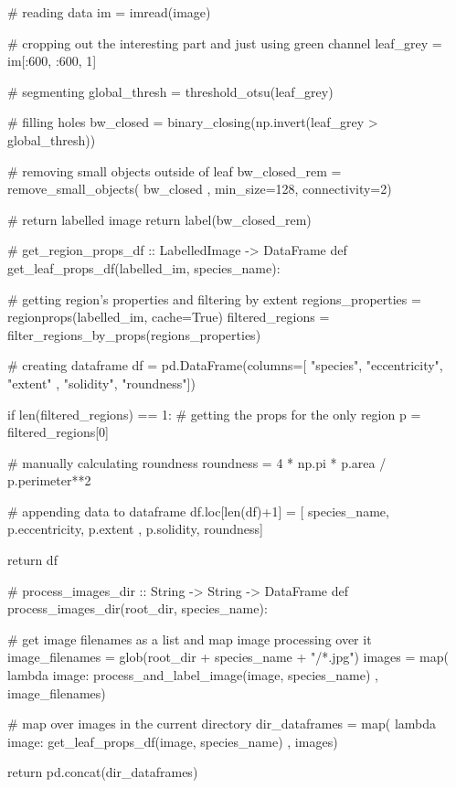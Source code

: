     # reading data
    im = imread(image)

    # cropping out the interesting part and just using green channel
    leaf_grey = im[:600, :600, 1]

    # segmenting
    global_thresh = threshold_otsu(leaf_grey)

    # filling holes
    bw_closed = binary_closing(np.invert(leaf_grey > global_thresh))

    # removing small objects outside of leaf
    bw_closed_rem = remove_small_objects( bw_closed
                                        , min_size=128, connectivity=2)

    # return labelled image
    return label(bw_closed_rem)


# get_region_props_df :: LabelledImage -> DataFrame
def get_leaf_props_df(labelled_im, species_name):

    # getting region's properties and filtering by extent
    regions_properties = regionprops(labelled_im, cache=True)
    filtered_regions = filter_regions_by_props(regions_properties)

    # creating dataframe
    df = pd.DataFrame(columns=[ "species", "eccentricity", "extent"
                              , "solidity", "roundness"])

    if len(filtered_regions) == 1:
        # getting the props for the only region
        p = filtered_regions[0]

        # manually calculating roundness
        roundness = 4 * np.pi * p.area / p.perimeter**2

        # appending data to dataframe
        df.loc[len(df)+1] = [ species_name, p.eccentricity, p.extent
                            , p.solidity, roundness]

    return df


# process_images_dir :: String -> String -> DataFrame
def process_images_dir(root_dir, species_name):

    # get image filenames as a list and map image processing over it
    image_filenames = glob(root_dir + species_name + "/*.jpg")
    images = map( lambda image: process_and_label_image(image, species_name)
                , image_filenames)

    # map over images in the current directory
    dir_dataframes = map( lambda image: get_leaf_props_df(image, species_name)
                        , images)

    return pd.concat(dir_dataframes)
\stopPYTHON

